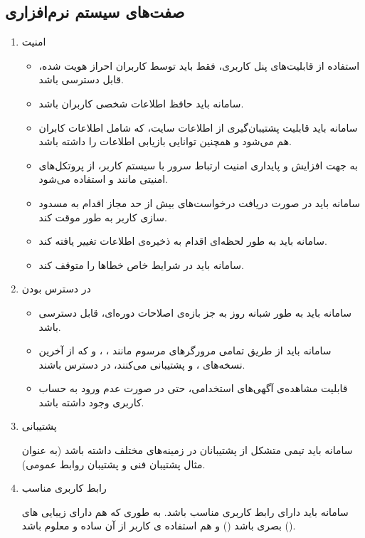 \clearpage
\subsection{صفت‌های سیستم‌ نرم‌افزاری}
\begin{enumerate}
	\item امنیت
	\begin{itemize}
		\item استفاده از قابلیت‌های پنل کاربری، فقط باید توسط کاربران احراز هویت شده، قابل دسترسی باشد.
		\item سامانه باید حافظ اطلاعات شخصی کاربران باشد.
		\item سامانه باید قابلیت پشتیبان‌گیری از اطلاعات سایت، که شامل اطلاعات کابران هم می‌شود و همچنین توانایی بازیابی اطلاعات را داشته باشد.
		\item به جهت افزایش و پایداری امنیت ارتباط سرور با سیستم کاربر، از پروتکل‌های امنیتی مانند  و  استفاده می‌شود.
		\item سامانه باید در صورت دریافت درخواست‌های بیش از حد مجاز اقدام به مسدود سازی کاربر به طور موقت کند.
		\item سامانه باید به طور لحظه‌ای اقدام به ذخیره‌ی اطلاعات تغییر یافته کند.
		\item سامانه باید در شرایط خاص خطاها را متوقف کند.
	\end{itemize}
	
	\item در دسترس بودن
	\begin{itemize}
		\item سامانه باید به طور شبانه روز به جز بازه‌ی اصلاحات دوره‌ای، قابل دسترسی باشد.
		\item
		سامانه باید از طریق تمامی مرورگر‌های مرسوم مانند
		،
		،
		و
		که از آخرین نسخه‌های
		،
		و
		پشتیبانی می‌کنند، در دسترس باشند.
		\item
		قابلیت مشاهده‌ی آگهی‌های استخدامی، حتی در صورت عدم ورود به حساب کاربری وجود داشته باشد.
	\end{itemize}
	
	\item پشتیبانی
	
	سامانه باید تیمی متشکل از پشتیبانان در زمینه‌های مختلف داشته باشد (به عنوان مثال پشتیبان فنی و پشتیبان روابط عمومی).
	
	\item رابط کاربری مناسب
	
	سامانه باید دارای رابط کاربری مناسب باشد. به طوری که هم دارای زیبایی های بصری باشد () و هم استفاده ی کاربر از آن ساده و معلوم باشد ().
	
\end{enumerate}

